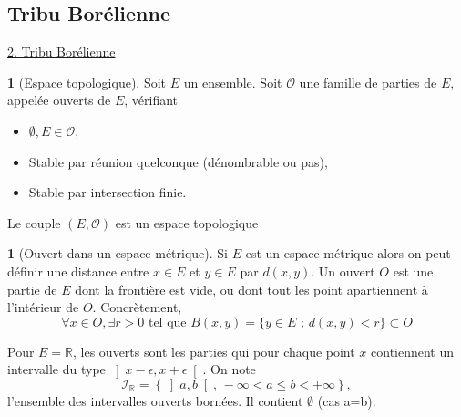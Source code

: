 \documentclass[8pt,notheorems]{beamer}
\theoremstyle{definition}
\newtheorem{definition}{\translate{Definition}}
\theoremstyle{example}
\newtheorem{example}{\translate{Exemple}}
\theoremstyle{mystyle}
\theoremstyle{plain}
\begin{document}
\subsection{Tribu Borélienne}
\begin{frame}[allowframebreaks]

\underline{2. Tribu Borélienne}
\\
\begin{definition}[Espace topologique]
Soit $E$ un ensemble. Soit $\mathcal{O}$ une famille de parties de $E$, appelée ouverts de $E$, vérifiant
\begin{itemize}
\item $\emptyset,E\in\mathcal{O}$,
\item Stable par réunion quelconque (dénombrable ou pas),
\item Stable par intersection finie.
\end{itemize}
Le couple $(E,\mathcal{O})$ est un espace topologique
\end{definition}
\begin{example}[Ouvert dans un espace métrique]
Si $E$ est un espace métrique alors on peut définir une distance entre $x\in E$ et $y\in E$ par $d(x,y)$. Un ouvert $O$ est une partie de $E$ dont la frontière est vide, ou dont tout les point apartiennent à l'intérieur de $O$. Concrètement,
$$
\forall x\in O, \exists r>0\text{ tel que }B(x,y)=\{y\in E\text{ ; }d(x,y)<r\}\subset O
$$
\end{example}
Pour $E=\mathbb{R}$, les ouverts sont les parties qui pour chaque point $x$ contiennent un intervalle du type $\left]x-\epsilon,x+\epsilon\right[$. On note
$$
\mathcal{I}_{\mathbb{R}}=\left\{\left]a,b\right[\text{, }-\infty<a\leq b<+\infty\right\},
$$
l'ensemble des intervalles ouverts bornées. Il contient $\emptyset$ (cas a=b).


\end{frame}
\end{document}
